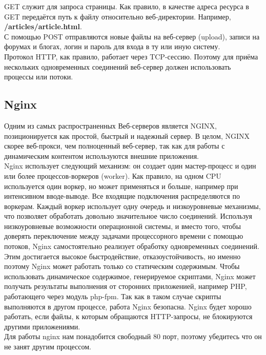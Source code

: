 \documentclass[14pt, a4paper]{article}
\begin{document}
GET служит для запроса страницы. Как правило, в качестве адреса ресурса в GET передаётся путь к
файлу относительно веб-директории. Например, \textbf{/articles/article.html}.\\

С помощью POST отправляются новые файлы на веб-сервер (upload), записи на форумах и блогах,
логин и пароль для входа в ту или иную систему.\\

Протокол HTTP, как правило, работает через TCP-сессию. Поэтому для приёма нескольких
одновременных соединений веб-сервер должен использовать процессы или потоки.

\subsection*{Nginx} 

Одним из самых распространенных Веб-серверов является NGINX, позиционируется как простой,
быстрый и надежный сервер. В целом, NGINX скорее веб-прокси, чем полноценный веб-сервер, так
как для работы с динамическим контентом используются внешние приложения.\\

Nginx использует следующий механизм: он создает один мастер-процесс и один или более
процессов-воркеров (worker). Как правило, на одном CPU используется один воркер, но может
применяться и больше, например при интенсивном вводе-выводе. Все входящие подключения
распределяются по воркерам. Каждый воркер использует одну очередь и низкоуровневые механизмы,
что позволяет обработать довольно значительное число соединений. Используя низкоуровневые
возможности операционной системы, и вместо того, чтобы доверять переключение между задачами
процессорного времени с помощью потоков, Nginx самостоятельно реализует обработку
одновременных соединений. Этим достигается высокое быстродействие, отказоустойчивость, но
именно поэтому Nginx может работать только со статическим содержимым. Чтобы использовать
динамическое содержимое, генерируемое скриптами, Nginx может получать результаты выполнения
от сторонних приложенией, например PHP, работающего через модуль php-fpm. Так как в таком
случае скрипты выполняются в другом процессе, работа Nginx безопасна. Nginx будет хорошо
работать, если файлы, к которым обращаются HTTP-запросы, не блокируются другими
приложениями.\\

Для работы nginx нам понадобится свободный 80 порт, поэтому убедитесь что он не занят другим
процессом.
\end{document}
